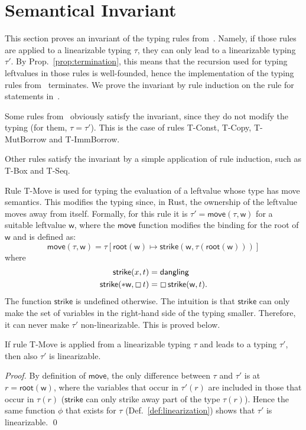 \section{Semantical Invariant}\label{sec:invariant}

This section proves an invariant of the typing rules
from~\cite{Pearce21}. Namely,
if those rules are applied to a linearizable typing $\tau$,
they can only lead to a linearizable typing $\tau'$.
By Prop.~\ref{prop:termination}, this means that the recursion used for
typing leftvalues in those rules is well-founded,
hence the implementation of the typing rules from~\cite{Pearce21} terminates.
We prove the invariant by rule induction on the rule for statements in~\cite{Pearce21}.

Some rules from~\cite{Pearce21} obviously satisfy the invariant,
since they do not modify the typing (for them, $\tau=\tau'$).
This is the case of rules
\textsf{T-Const}, \textsf{T-Copy}, \textsf{T-MutBorrow} and
\textsf{T-ImmBorrow}.

Other rules satisfy the invariant by a simple application of
rule induction, such as \textsf{T-Box} and \textsf{T-Seq}.

Rule \textsf{T-Move} is used for typing the evaluation of a leftvalue
whose type has move semantics. This modifies the typing since, in Rust,
the ownership of the leftvalue moves away from itself.
Formally, for this rule it is $\tau'=\mathsf{move}(\tau,\mathsf{w})$
for a suitable leftvalue $\mathsf{w}$,
where the $\mathsf{move}$ function
modifies the binding for the root of $\mathsf{w}$ and is defined as:
\[
\mathsf{move}(\tau,\mathsf{w})=\tau[\mathsf{root}(\mathsf{w})\mapsto
  \mathsf{strike}(\mathsf{w},\tau(\mathsf{root}(\mathsf{w})))]
\]
where
\begin{align*}
  \mathsf{strike}(x,t)&=\mathsf{dangling}\\
  \mathsf{strike}(\mathtt{*}\mathsf{w},\boxempty\,{t})&=
  \boxempty\,{\mathsf{strike}(\mathsf{w},t)}.
\end{align*}
The function $\mathsf{strike}$ is undefined otherwise. The intuition is that
$\mathsf{strike}$ can only make the set of variables in the right-hand side
of the typing smaller. Therefore, it can never make $\tau'$
non-linearizable. This is proved below.

\begin{lemma}\label{lem:move_invariant}
  If rule \textsf{T-Move} is applied from a linearizable typing $\tau$
  and leads to a typing $\tau'$, then also $\tau'$ is linearizable.
\end{lemma}
\begin{proof}
  By definition of $\mathsf{move}$, the only
  difference between $\tau$ and $\tau'$ is at $r=\mathsf{root}(\mathsf{w})$,
  where the variables that occur in $\tau'(r)$ are included in those that occur
  in $\tau(r)$ ($\mathsf{strike}$ can only strike away part of the type $\tau(r)$).
  Hence the same function $\phi$ that exists for $\tau$ (Def.~\ref{def:linearization})
  shows that $\tau'$ is linearizable.
  \qed
\end{proof}

